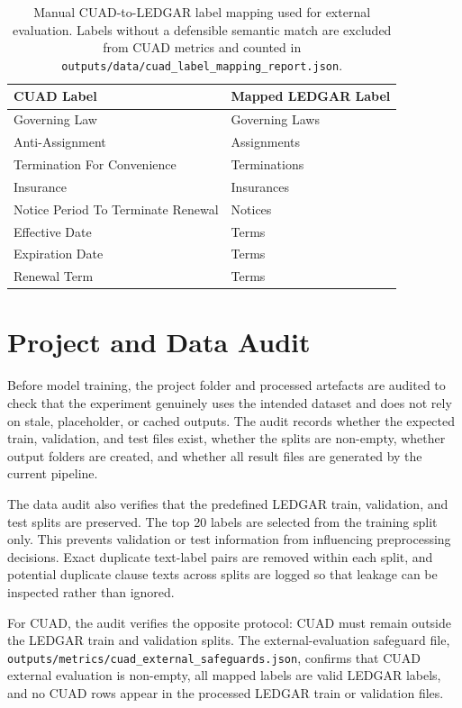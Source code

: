 \documentclass[11pt]{article}
\begin{document}
\begin{table}[t]
\centering
\small
\begin{tabular}{ll}
\toprule
\textbf{CUAD Label} & \textbf{Mapped LEDGAR Label} \\
\midrule
Governing Law & Governing Laws \\
Anti-Assignment & Assignments \\
Termination For Convenience & Terminations \\
Insurance & Insurances \\
Notice Period To Terminate Renewal & Notices \\
Effective Date & Terms \\
Expiration Date & Terms \\
Renewal Term & Terms \\
\bottomrule
\end{tabular}
\caption{Manual CUAD-to-LEDGAR label mapping used for external evaluation. Labels without a defensible semantic match are excluded from CUAD metrics and counted in \texttt{outputs/data/cuad\_label\_mapping\_report.json}.}
\label{tab:cuad-label-map}
\end{table}

\section{Project and Data Audit}

Before model training, the project folder and processed artefacts are audited to check that the experiment genuinely uses the intended dataset and does not rely on stale, placeholder, or cached outputs. The audit records whether the expected train, validation, and test files exist, whether the splits are non-empty, whether output folders are created, and whether all result files are generated by the current pipeline.

The data audit also verifies that the predefined LEDGAR train, validation, and test splits are preserved. The top 20 labels are selected from the training split only. This prevents validation or test information from influencing preprocessing decisions. Exact duplicate text-label pairs are removed within each split, and potential duplicate clause texts across splits are logged so that leakage can be inspected rather than ignored.

For CUAD, the audit verifies the opposite protocol: CUAD must remain outside the LEDGAR train and validation splits. The external-evaluation safeguard file, \texttt{outputs/metrics/cuad\_external\_safeguards.json}, confirms that CUAD external evaluation is non-empty, all mapped labels are valid LEDGAR labels, and no CUAD rows appear in the processed LEDGAR train or validation files.
\end{document}
